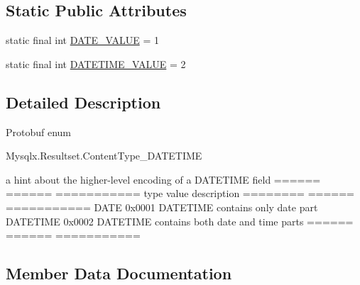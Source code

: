 \subsection*{Static Public Attributes}
\begin{DoxyCompactItemize}
\item 
static final int \mbox{\hyperlink{enumcom_1_1mysql_1_1cj_1_1x_1_1protobuf_1_1_mysqlx_resultset_1_1_content_type___d_a_t_e_t_i_m_e_acf12c221884a0c0248aec490d30d301c}{D\+A\+T\+E\+\_\+\+V\+A\+L\+UE}} = 1
\item 
static final int \mbox{\hyperlink{enumcom_1_1mysql_1_1cj_1_1x_1_1protobuf_1_1_mysqlx_resultset_1_1_content_type___d_a_t_e_t_i_m_e_a70488fdeb74561265df622ee9e4e1910}{D\+A\+T\+E\+T\+I\+M\+E\+\_\+\+V\+A\+L\+UE}} = 2
\end{DoxyCompactItemize}


\subsection{Detailed Description}
Protobuf enum
\begin{DoxyCode}
Mysqlx.Resultset.ContentType\_DATETIME 
\end{DoxyCode}



\begin{DoxyPre}
a hint about the higher-level encoding of a DATETIME field
======   ====== ===========
type     value  description
======== ====== ===========
DATE     0x0001 DATETIME contains only date part
DATETIME 0x0002 DATETIME contains both date and time parts
======   ====== ===========
\end{DoxyPre}
 

\subsection{Member Data Documentation}
\mbox{\label{enumcom_1_1mysql_1_1cj_1_1x_1_1protobuf_1_1_mysqlx_resultset_1_1_content_type___d_a_t_e_t_i_m_e_a30212d00ab311043597150438c4c0c6d}} 
